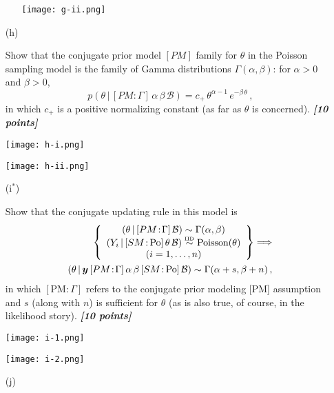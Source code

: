 \documentclass[12pt]{article}
\newcommand{\given}{\, | \,}
\newcommand{\bi}[1]{\b{\i{#1}}}
\renewcommand{\b}[1]{\textbf{#1}}
\renewcommand{\i}[1]{\textit{#1}}
\renewcommand{\r}[1]{\text{#1}}
\begin{document}
\begin{itemize}
\begin{itemize}
    \centering
    \texttt{[image: g-ii.png]}


\end{itemize}

\item[(h)]

Show that the conjugate prior model $[ PM ]$ family for $\theta$ in the Poisson sampling model is the family of Gamma distributions $\Gamma ( \alpha, \beta )$: for $\alpha > 0$ and $\beta > 0$,
\begin{equation} \label{e:poisson-2}
p ( \theta \given [ PM \colon \! \Gamma ] \, \alpha \, \beta \, \mathcal{ B } ) = c_+ \, \theta^{ \alpha - 1 } \, e^{ - \beta \, \theta } \, ,
\end{equation}
in which $c_+$ is a positive normalizing constant (as far as $\theta$ is concerned). \bi{[10 points]}


    \centering
    \texttt{[image: h-i.png]}

    \centering
    \texttt{[image: h-ii.png]}


\item[(i$^*$)]

Show that the conjugate updating rule in this model is
\begin{eqnarray} \label{e:updating-1}
\left\{ \begin{array}{c} ( \theta \given [ PM \! : \! \Gamma ] \, \mathcal{ B } ) \sim \Gamma ( \alpha, \beta ) \\ ( Y_i \given [ SM \colon \! \r{Po} ] \, \theta \, \mathcal{ B } ) \stackrel{ \mbox{\tiny IID} }{ \sim } \textrm{Poisson} ( \theta ) \\ ( i = 1, \dots, n ) \end{array} \right\} \Longrightarrow \nonumber \\ ( \theta \given \bm{ y } \, [ PM \! : \! \Gamma ] \, \alpha \, \beta \, [ SM \colon \! \r{Po} ] \, \mathcal{ B } ) \sim \Gamma ( \alpha + s, \beta + n ) \, ,
\end{eqnarray}
in which $[ \textrm{PM:} \, \Gamma ]$ refers to the conjugate prior modeling [PM] assumption and $s$ (along with $n$) is sufficient for $\theta$ (as is also true, of course, in the likelihood story). \bi{[10 points]}

\centering
    \texttt{[image: i-1.png]}

\centering
    \texttt{[image: i-2.png]}

\item[(j)]


\end{itemize}
\end{document}
